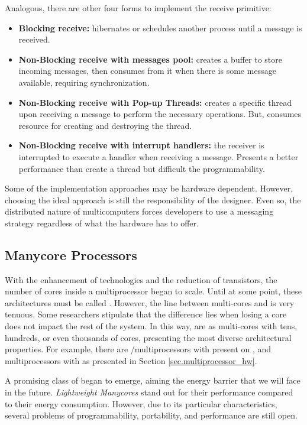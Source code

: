 				Analogous, there are other four forms to implement the receive primitive:
				\begin{itemize}
					\item \textbf{Blocking receive:} \cpu hibernates or schedules another
						process until a message is received.
					\item \textbf{Non-Blocking receive with messages pool:} \cpu creates
						a buffer to store incoming messages, then consumes from it when
						there is some message available, requiring synchronization.
					\item \textbf{Non-Blocking receive with Pop-up Threads:} creates a specific
						thread upon receiving a message to perform the necessary operations.
						But, consumes resource for creating and destroying the thread.
					\item \textbf{Non-Blocking receive with interrupt handlers:} the receiver
						is interrupted to execute a handler when receiving a message.
						Presents a better performance than create a thread but difficult
						the programmability.
				\end{itemize}

				Some of the implementation approaches may be hardware dependent.
				However, choosing the ideal approach is still the responsibility of the \os designer.
				Even so, the distributed nature of multicomputers forces developers to
				use a messaging strategy regardless of what the hardware has to offer.
	
	\subsection{Manycore Processors}
	\label{sec.manycores}

		With the enhancement of technologies and the reduction of transistors,
		the number of cores inside a multiprocessor began to scale.
		Until at some point, these architectures must be called \manycores.
		However, the line between multi-cores and \manycores is very tenuous.
		Some researchers stipulate that the difference lies when losing a core
		does not impact the rest of the system.
		In this way, \manycores are as multi-cores with tens, hundreds, or even
		thousands of cores, presenting the most diverse architectural properties.
		For example, there are \uma/\numa multiprocessors with \simd present on
		\gpus, and \numa multiprocessors with \mimd as \mppa presented in Section \ref{sec.multiprocessor_hw}.

		A promising class of \manycores began to emerge, aiming the energy barrier
		that we will face in the future.
		\textit{Lightweight Manycores} stand out for their performance compared
		to their energy consumption.
		However, due to its particular characteristics, several problems of
		programmability, portability, and performance are still open.

